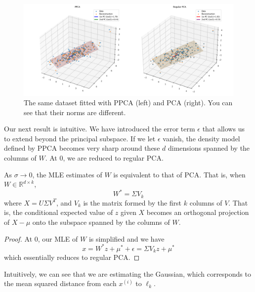 \begin{example}
    \begin{figure}[H]
      \centering 
      \includegraphics[scale=0.35]{img/ppca_vs_pca.png}
      \caption{The same dataset fitted with PPCA (left) and PCA (right). You can see that their norms are different.} 
    \end{figure}
  \end{example}

  Our next result is intuitive. We have introduced the error term $\epsilon$ that allows us to extend beyond the principal subspace. If we let $\epsilon$ vanish, the density model defined by PPCA becomes very sharp around these $d$ dimensions spanned by the columns of $W$. At $0$, we are reduced to regular PCA. 

  \begin{theorem} 
    As $\sigma \rightarrow 0$, the MLE estimates of $W$ is equivalent to that of PCA. That is, when $W \in \mathbb{R}^{d \times k}$, 
    \begin{equation}
      W^\ast = \Sigma V_k
    \end{equation} 
    where $X = U \Sigma V^T$, and $V_k$ is the matrix formed by the first $k$ columns of $V$. That is, the conditional expected value of $z$ given $X$ becomes an orthogonal projection of $X - \mu$ onto the subspace spanned by the columns of $W$. 
  \end{theorem}
  \begin{proof}
    At $0$, our MLE of $W$ is simplified and we have 
    \begin{equation}
      x = W^\ast z + \mu^\ast + \epsilon = \Sigma V_k z + \mu^\ast
    \end{equation}
    which essentially reduces to regular PCA. 
  \end{proof}

  Intuitively, we can see that we are estimating the Gaussian, which corresponds to the mean squared distance from each $x^{(i)}$ to $\ell_k$. 

